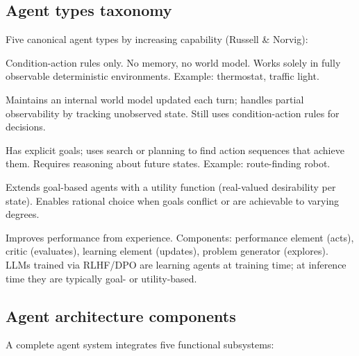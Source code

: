 \subsection{Agent types taxonomy}

Five canonical agent types by increasing capability (Russell \& Norvig):

\begin{description}[leftmargin=1.5em, style=nextline]
  \item[Simple reflex agent]
    Condition-action rules only. No memory, no world model. Works solely in fully
    observable deterministic environments. Example: thermostat, traffic light.

  \item[Model-based reflex agent]
    Maintains an internal world model updated each turn; handles partial observability
    by tracking unobserved state. Still uses condition-action rules for decisions.

  \item[Goal-based agent]
    Has explicit goals; uses search or planning to find action sequences that achieve
    them. Requires reasoning about future states. Example: route-finding robot.

  \item[Utility-based agent]
    Extends goal-based agents with a utility function (real-valued desirability per
    state). Enables rational choice when goals conflict or are achievable to varying
    degrees.

  \item[Learning agent]
    Improves performance from experience. Components: performance element (acts),
    critic (evaluates), learning element (updates), problem generator (explores).
    LLMs trained via RLHF/DPO are learning agents at training time; at inference time
    they are typically goal- or utility-based.
\end{description}

\subsection{Agent architecture components}

A complete agent system integrates five functional subsystems:

